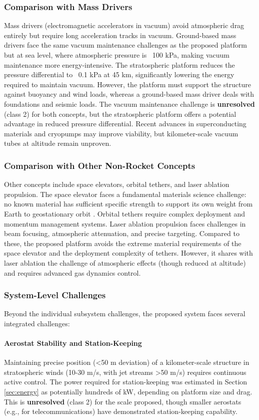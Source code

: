 \subsubsection{Comparison with Mass Drivers}
Mass drivers (electromagnetic accelerators in vacuum) avoid atmospheric drag entirely but require long acceleration tracks in vacuum. Ground-based mass drivers face the same vacuum maintenance challenges as the proposed platform but at sea level, where atmospheric pressure is ~100 kPa, making vacuum maintenance more energy-intensive. The stratospheric platform reduces the pressure differential to ~0.1 kPa at 45 km, significantly lowering the energy required to maintain vacuum. However, the platform must support the structure against buoyancy and wind loads, whereas a ground-based mass driver deals with foundations and seismic loads. The vacuum maintenance challenge is \textbf{unresolved} (class 2) for both concepts, but the stratospheric platform offers a potential advantage in reduced pressure differential. Recent advances in superconducting materials and cryopumps may improve viability, but kilometer-scale vacuum tubes at altitude remain unproven.

\subsubsection{Comparison with Other Non-Rocket Concepts}
Other concepts include space elevators, orbital tethers, and laser ablation propulsion. The space elevator faces a fundamental materials science challenge: no known material has sufficient specific strength to support its own weight from Earth to geostationary orbit \cite{edwards2003}. Orbital tethers require complex deployment and momentum management systems. Laser ablation propulsion faces challenges in beam focusing, atmospheric attenuation, and precise targeting. Compared to these, the proposed platform avoids the extreme material requirements of the space elevator and the deployment complexity of tethers. However, it shares with laser ablation the challenge of atmospheric effects (though reduced at altitude) and requires advanced gas dynamics control.

\subsubsection{System-Level Challenges}
Beyond the individual subsystem challenges, the proposed system faces several integrated challenges:

\paragraph{Aerostat Stability and Station-Keeping}
Maintaining precise position (<50 m deviation) of a kilometer-scale structure in stratospheric winds (10-30 m/s, with jet streams >50 m/s) requires continuous active control. The power required for station-keeping was estimated in Section \ref{sec:energy} as potentially hundreds of kW, depending on platform size and drag. This is \textbf{unresolved} (class 2) for the scale proposed, though smaller aerostats (e.g., for telecommunications) have demonstrated station-keeping capability.

